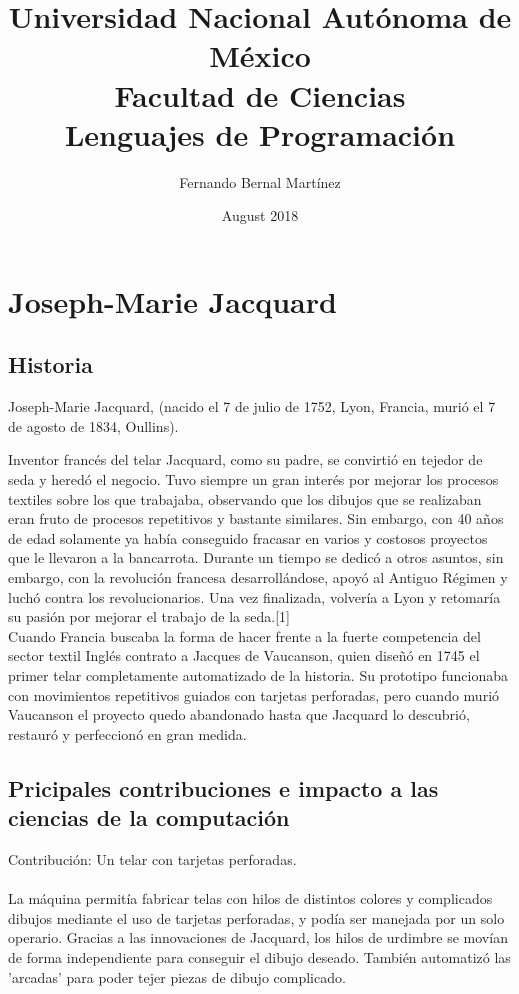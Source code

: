 \documentclass{article}
\title{Universidad Nacional Aut\'onoma de M\'exico\\
Facultad de Ciencias\\
Lenguajes de Programación}
\author{Fernando Bernal Mart\'inez }
\date{August 2018}
\begin{document}
\maketitle

\section{Joseph-Marie Jacquard}

    \subsection{Historia}
    Joseph-Marie Jacquard, (nacido el 7 de julio de 1752,
    Lyon, Francia, murió el 7 de agosto de 1834, Oullins).
    
    Inventor francés del telar Jacquard, como su padre, se convirtió en tejedor de seda y heredó el negocio. Tuvo siempre un gran interés por mejorar los procesos textiles sobre los que trabajaba, observando que los dibujos que se realizaban eran fruto de procesos repetitivos y bastante similares. Sin embargo, con 40 años de edad solamente ya había conseguido fracasar en varios y costosos proyectos que le llevaron  a  la  bancarrota.
    Durante un tiempo se dedicó a otros asuntos, sin embargo, con la
    revolución francesa desarrollándose, apoyó al Antiguo
    Régimen y luchó contra los revolucionarios. Una vez
    finalizada, volvería a Lyon y retomaría su pasión por
    mejorar el trabajo de la seda.[1]\\
    
    Cuando Francia buscaba la forma de hacer frente a la fuerte competencia del sector textil Inglés contrato a Jacques de Vaucanson, quien diseñó en 1745 el primer telar completamente automatizado de la historia. Su prototipo funcionaba con movimientos repetitivos guiados con tarjetas perforadas, pero cuando muri\'o Vaucanson el proyecto quedo abandonado hasta que Jacquard lo descubrió, restauró y perfeccionó en gran medida.
    
    \subsection{Pricipales contribuciones e impacto a las ciencias de la computación}
    Contribuci\'on: Un telar con tarjetas perforadas.\\\\
    La máquina permitía fabricar telas con hilos de distintos colores y complicados dibujos mediante el uso de tarjetas perforadas, y podía ser manejada por un solo operario. Gracias a las innovaciones de Jacquard, los hilos de urdimbre se movían de forma independiente para conseguir el dibujo deseado. También automatizó las 'arcadas' para poder tejer piezas de dibujo complicado.\\
    
\end{document}
